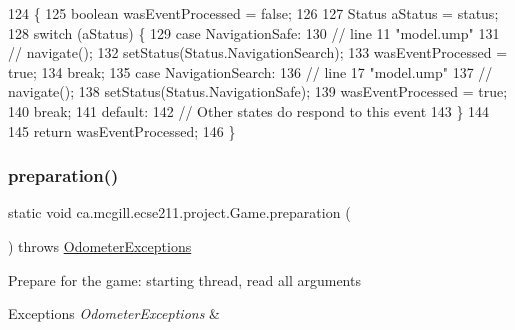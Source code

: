 \begin{DoxyCode}
124                                      \{
125     \textcolor{keywordtype}{boolean} wasEventProcessed = \textcolor{keyword}{false};
126 
127     Status aStatus = status;
128     \textcolor{keywordflow}{switch} (aStatus) \{
129       \textcolor{keywordflow}{case} NavigationSafe:
130         \textcolor{comment}{// line 11 "model.ump"}
131         \textcolor{comment}{// navigate();}
132         setStatus(Status.NavigationSearch);
133         wasEventProcessed = \textcolor{keyword}{true};
134         \textcolor{keywordflow}{break};
135       \textcolor{keywordflow}{case} NavigationSearch:
136         \textcolor{comment}{// line 17 "model.ump"}
137         \textcolor{comment}{// navigate();}
138         setStatus(Status.NavigationSafe);
139         wasEventProcessed = \textcolor{keyword}{true};
140         \textcolor{keywordflow}{break};
141       \textcolor{keywordflow}{default}:
142         \textcolor{comment}{// Other states do respond to this event}
143     \}
144 
145     \textcolor{keywordflow}{return} wasEventProcessed;
146   \}
\end{DoxyCode}
\mbox{\label{enumca_1_1mcgill_1_1ecse211_1_1project_1_1_game_a1bcbd1c19309c65a6887ae19bde66765}} 
\subsubsection{\texorpdfstring{preparation()}{preparation()}}
{\footnotesize\ttfamily static void ca.\+mcgill.\+ecse211.\+project.\+Game.\+preparation (\begin{DoxyParamCaption}{ }\end{DoxyParamCaption}) throws \hyperlink{classca_1_1mcgill_1_1ecse211_1_1odometer_1_1_odometer_exceptions}{Odometer\+Exceptions}\hspace{0.3cm}{\ttfamily [static]}}

Prepare for the game\+: starting thread, read all arguments


\begin{DoxyExceptions}{Exceptions}
{\em Odometer\+Exceptions} & \\
\hline
\end{DoxyExceptions}


